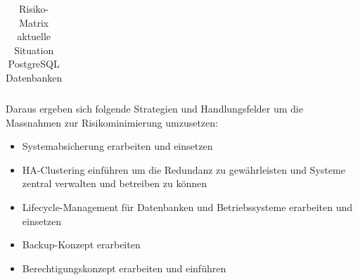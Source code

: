 \begin{flushleft}
\begin{table}[H]
{\begin{tabular}{llllllllllll}
    \end{tabular}%
    }
    \caption{Risiko-Matrix aktuelle Situation PostgreSQL Datenbanken}
    \label{tab:riskmatrix-postgresql}
    \end{table}
\end{flushleft}


\begin{flushleft}
\clearpage
{}
\recalctypearea
    Daraus ergeben sich folgende Strategien und Handlungsfelder um die Massnahmen zur Risikominimierung umzusetzen:
    \begin{itemize}
        \item Systemabsicherung erarbeiten und einsetzen
        \item HA-Clustering einführen um die Redundanz zu gewährleisten und Systeme zentral verwalten und betreiben zu können
        \item Lifecycle-Management für Datenbanken und Betriebssysteme erarbeiten und einsetzen
        \item Backup-Konzept erarbeiten
        \item Berechtigungskonzept erarbeiten und einführen
    \end{itemize}
\end{flushleft}
